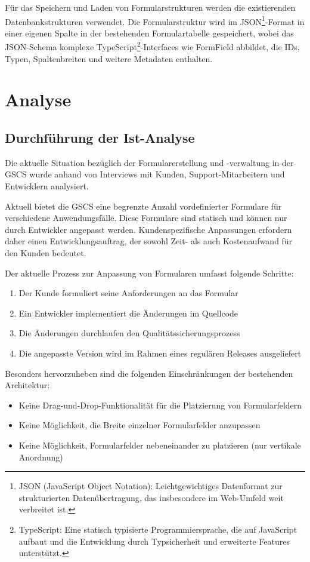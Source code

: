 \documentclass[a4paper,11pt]{article}
\begin{document}
\noindent Für das Speichern und Laden von Formularstrukturen werden die existierenden Datenbankstrukturen verwendet. Die Formularstruktur wird im JSON\footnote{JSON (JavaScript Object Notation): Leichtgewichtiges Datenformat zur strukturierten Datenübertragung, das insbesondere im Web-Umfeld weit verbreitet ist.}-Format in einer eigenen Spalte in der bestehenden Formulartabelle gespeichert, wobei das JSON-Schema komplexe TypeScript\footnote{TypeScript: Eine statisch typisierte Programmiersprache, die auf JavaScript aufbaut und die Entwicklung durch Typsicherheit und erweiterte Features unterstützt.}-Interfaces wie FormField abbildet, die IDs, Typen, Spaltenbreiten und weitere Metadaten enthalten.


\section{Analyse}
\subsection{Durchführung der Ist-Analyse}
Die aktuelle Situation bezüglich der Formularerstellung und -verwaltung in der GSCS wurde anhand von Interviews mit Kunden, Support-Mitarbeitern und Entwicklern analysiert.


\noindent Aktuell bietet die GSCS eine begrenzte Anzahl vordefinierter Formulare für verschiedene Anwendungsfälle. Diese Formulare sind statisch und können nur durch Entwickler angepasst werden. Kundenspezifische Anpassungen erfordern daher einen Entwicklungsauftrag, der sowohl Zeit- als auch Kostenaufwand für den Kunden bedeutet.

\noindent Der aktuelle Prozess zur Anpassung von Formularen umfasst folgende Schritte:
\begin{enumerate}
  \item Der Kunde formuliert seine Anforderungen an das Formular
  \item Ein Entwickler implementiert die Änderungen im Quellcode
  \item Die Änderungen durchlaufen den Qualitätssicherungsprozess
  \item Die angepasste Version wird im Rahmen eines regulären Releases ausgeliefert
\end{enumerate}

\noindent Besonders hervorzuheben sind die folgenden Einschränkungen der bestehenden Architektur:

\begin{itemize}
  \item Keine Drag-und-Drop-Funktionalität für die Platzierung von Formularfeldern
  \item Keine Möglichkeit, die Breite einzelner Formularfelder anzupassen
  \item Keine Möglichkeit, Formularfelder nebeneinander zu platzieren (nur vertikale Anordnung)
\end{itemize}
\end{document}
